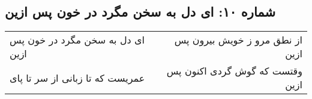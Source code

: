 \begin{center}
\section*{شماره ۱۰: ای دل به سخن مگرد در خون پس ازین}
\label{sec:010}
\begin{longtable}{l p{0.5cm} r}
ای دل به سخن مگرد در خون پس ازین
&&
از نطق مرو ز خویش بیرون پس ازین
\\
عمریست که تا زبانی از سر تا پای
&&
وقتست که گوش گردی اکنون پس ازین
\\
\end{longtable}
\end{center}
